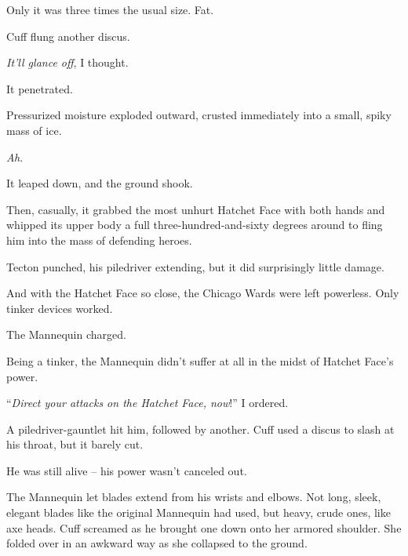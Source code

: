 Only it was three times the usual size.  Fat.



Cuff flung another discus.



\emph{It'll glance off}, I thought.



It penetrated.



Pressurized moisture exploded outward, crusted immediately into a small, spiky mass of ice.



\emph{Ah}.



It leaped down, and the ground shook.



Then, casually, it grabbed the most unhurt Hatchet Face with both hands and whipped its upper body a full three-hundred-and-sixty degrees around to fling him into the mass of defending heroes.



Tecton punched, his piledriver extending, but it did surprisingly little damage.



And with the Hatchet Face so close, the Chicago Wards were left powerless.  Only tinker devices worked.



The Mannequin charged.



Being a tinker, the Mannequin didn't suffer at all in the midst of Hatchet Face's power.



``\emph{Direct your attacks on the Hatchet Face, now}!'' I ordered.



A piledriver-gauntlet hit him, followed by another.  Cuff used a discus to slash at his throat, but it barely cut.



He was still alive – his power wasn't canceled out.



The Mannequin let blades extend from his wrists and elbows.   Not long, sleek, elegant blades like the original Mannequin had used, but heavy, crude ones, like axe heads.  Cuff screamed as he brought one down onto her armored shoulder.  She folded over in an awkward way as she collapsed to the ground.



